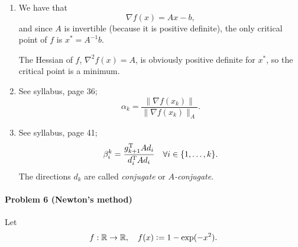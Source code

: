 \begin{enumerate}
  \item We have that
\[
\nabla f(x) = Ax - b,
\]
and since $A$ is invertible (because it is positive definite), the only
critical point of $f$ is $x^*=A^{-1}b$.

The Hessian of $f$, $\nabla^2 f(x) = A$, is obviously positive definite for
$x^*$, so the critical point is a minimum.

  \item See syllabus, page 36;
\[
\alpha_k = \frac{\|\nabla f(x_k)\|}{\|\nabla f(x_k)\|_A}.
\]

  \item See syllabus, page 41;
\[
\beta_i^k = \frac{g_{k+1}^{\text{\upshape T}} A d_i}{d_i^{\text{\upshape T}} A d_i} \quad\forall i\in\{1,\dots,k\}.
\]
  The directions $d_k$ are called \emph{conjugate} or \emph{$A$-conjugate}.
\end{enumerate}
\paragraph{Problem 6 (Newton's method)}

Let
\[
  f: \mathbb{R} \to \mathbb{R},\quad f(x) \mathrel{\mathop:}= 1 - \exp(-x^2).
\]

